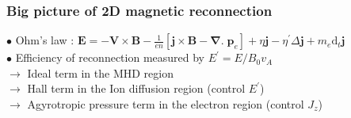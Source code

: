 \documentclass{beamer}
\newcommand{\D}{{\mathrm d}}
\begin{document}
\begin{frame}
\frametitle{Big picture of 2D magnetic reconnection}

\begin{center}

\end{center}

$\bullet$ Ohm's law : $\displaystyle \mathbf E = - \mathbf V \times \mathbf B - \frac{1}{en} [\mathbf j \times \mathbf B - \boldsymbol{\nabla} . \; \mathbf p_e] + \eta \mathbf j - \eta^{\prime} \Delta \mathbf j + m_e \D _t \mathbf j$ \\[0.2cm]
$\bullet$ Efficiency  of reconnection measured by $E^{\prime} = E/B_0 v_A$ \\[0.1cm]
$\to$ Ideal term in the MHD region \\
$\to$ Hall term in the Ion diffusion region (control $E^{\prime}$) \\
$\to$ Agyrotropic pressure term in the electron region (control $J_z$) \\

\end{frame}
\end{document}
